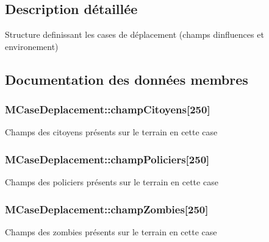 \subsection{Description détaillée}
Structure definissant les cases de déplacement (champs d\textquotesingle{}influences et environement) 

\subsection{Documentation des données membres}
\subsubsection[{\texorpdfstring{champ\+Citoyens}{champCitoyens}}]{\setlength{\rightskip}{0pt plus 5cm}M\+Case\+Deplacement\+::champ\+Citoyens\mbox{[}250\mbox{]}}\hypertarget{structMCaseDeplacement_a992e7ffc50e45a8fb49a982dcc392aa8}{}\label{structMCaseDeplacement_a992e7ffc50e45a8fb49a982dcc392aa8}
Champs des citoyens présents sur le terrain en cette case 
\subsubsection[{\texorpdfstring{champ\+Policiers}{champPoliciers}}]{\setlength{\rightskip}{0pt plus 5cm}M\+Case\+Deplacement\+::champ\+Policiers\mbox{[}250\mbox{]}}\hypertarget{structMCaseDeplacement_a98792df104a1bbab569aa9d0a86af554}{}\label{structMCaseDeplacement_a98792df104a1bbab569aa9d0a86af554}
Champs des policiers présents sur le terrain en cette case 
\subsubsection[{\texorpdfstring{champ\+Zombies}{champZombies}}]{\setlength{\rightskip}{0pt plus 5cm}M\+Case\+Deplacement\+::champ\+Zombies\mbox{[}250\mbox{]}}\hypertarget{structMCaseDeplacement_a3507b4494325ec01693f9034eed8f681}{}\label{structMCaseDeplacement_a3507b4494325ec01693f9034eed8f681}
Champs des zombies présents sur le terrain en cette case 
